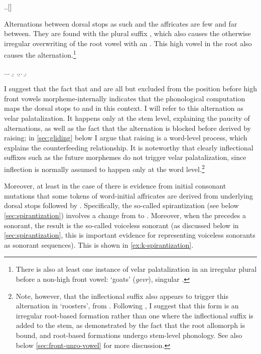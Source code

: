 \ex.\a.[]


Alternations between dorsal stops as such and the affricates are few and far between. They are found with the plural suffix , which also causes the otherwise irregular overwriting of the root vowel with an \ipa{[i(ː)]}. This high vowel in the root also causes the alternation.\footnote{There is also at least one instance of velar palatalization in an irregular plural before a non-high front vowel: \ipa{[dʒɛvər]} `goats' (\emph{gevr}), \cf singular \ipa{[ˈɡawr]}.}

\ex.\a.\a.
\b.
\z.\b.\a.
\b.

I suggest that the fact that \ipa{[k]} and \ipa{[ɡ]} are all but excluded from the position before high front vowels morpheme-internally indicates that the phonological computation maps the dorsal stops to \ipa{[ʧ]} and \ipa{[dʒ]} in this context. I will refer to this alternation as velar palatalization. It happens only at the stem level, explaining the paucity of alternations, as well as the fact that the alternation is blocked before \ipa{[i]} derived by raising; in \cref{sec:gliding} below I argue that raising is a word-level process, which explains the counterfeeding relationship. It is noteworthy that clearly inflectional suffixes such as the future morphemes do not trigger velar palatalization, since inflection is normally assumed to happen only at the word level.\footnote{\label{fn:kegi-stratal}Note, however, that the inflectional suffix  also appears to trigger this alternation in \ipa{[ˈʧiːdʒi]} `roosters', from \ipa{[ˈkɔɡ̊]}. Following \citet{bermudez-oterong}, I suggest that this form is an irregular root-based formation rather than one where the inflectional suffix is added to the stem, as demonstrated by the fact that the root allomorph \ipa{[ˈʧiːdʒ]} is bound, and root\hyp based formations undergo stem\hyp level phonology. See also below \cref{sec:front-unro-vowel} for more discussion.}

Moreover, at least in the case of \ipa{[ʧ]} there is evidence from initial consonant mutations that some tokens of word-initial affricates are derived from underlying dorsal stops followed by \ipa{[j]}. Specifically, the so-called spirantization (see below \cref{sec:spirantization}) involves a change from \ipa{[k]} to \ipa{[h]}. Moreover, when the \ipa{[k]} precedes a sonorant, the result is the so-called voiceless sonorant (as discussed below in \cref{sec:spirantization}, this is important evidence for representing voiceless sonorants as \ipa{[h]}\endash sonorant sequences). This is shown in \cref{ex:k-spirantization}.

